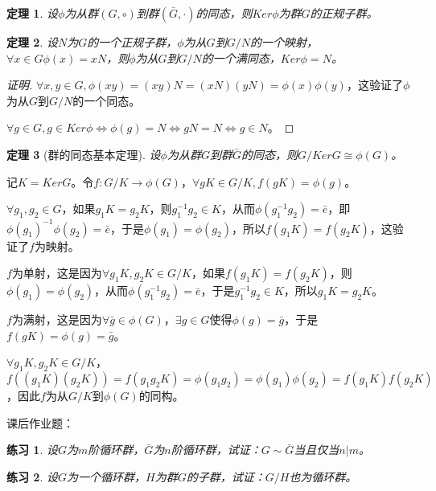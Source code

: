 \documentclass{article}
\newtheorem{Thm}{定理}
\newtheorem{Exercise}{练习}
\begin{document}
\begin{CJK*}{UTF8}{gbsn}
\begin{Thm}
  设$\phi$为从群$(G,\circ)$到群$(\bar{G},\cdot)$的同态，则$Ker \phi$为群$G$的正规子群。
\end{Thm}

\begin{Thm}
设$N$为$G$的一个正规子群，$\phi$为从$G$到$G/N$的一个映射，$\forall x\in G \phi(x)=xN$，则$\phi$为从$G$到$G/N$的一个满同态，$Ker \phi=N$。
\end{Thm}
\begin{proof}[证明]
  $\forall x,y\in G, \phi(xy)=(xy)N=(xN)(yN)=\phi(x)\phi(y)$，这验证了$\phi$为从$G$到$G/N$的一个同态。

  $\forall g\in G, g\in Ker\phi \Leftrightarrow \phi(g)=N \Leftrightarrow gN=N \Leftrightarrow g\in N$。
\end{proof}
\begin{Thm}[群的同态基本定理]
设$\phi$为从群$G$到群$\bar{G}$的同态，则$G/Ker G \cong \phi(G)$。
\end{Thm}
记$K=KerG$。令$f:G/K\to \phi(G)$，$\forall gK\in G/K, f(gK)=\phi(g)$。

$\forall g_1,g_2\in G$，如果$g_1K=g_2K$，则$g_1^{-1}g_2\in K$，从而$\phi(g_1^{-1}g_2)=\bar{e}$，即$\phi(g_1)^{-1}\phi(g_2)=\bar{e}$，于是$\phi(g_1)=\phi(g_2)$，所以$f(g_1K)=f(g_2K)$，这验证了$f$为映射。

$f$为单射，这是因为$\forall g_1K,g_2K\in G/K$，如果$f(g_1K)=f(g_2K)$，则$\phi(g_1)=\phi(g_2)$，从而$\phi(g_1^{-1}g_2)=\bar{e}$，于是$g_1^{-1}g_2\in K$，所以$g_1K=g_2K$。

$f$为满射，这是因为$\forall \bar{g}\in \phi(G)$，$\exists g\in G$使得$\phi(g)=\bar{g}$，于是$f(gK)=\phi(g)=\bar{g}$。

$\forall g_1K,g_2K\in G/K$，$f((g_1K)(g_2K))=f(g_1g_2K)=\phi(g_1g_2)=\phi(g_1)\phi(g_2)=f(g_1K)f(g_2K)$，因此$f$为从$G/K$到$\phi(G)$的同构。

课后作业题：
\begin{Exercise}
设$G$为$m$阶循环群，$\bar{G}$为$n$阶循环群，试证：$G \sim \bar{G}$当且仅当$n | m$。
\end{Exercise}

\begin{Exercise}
设$G$为一个循环群，$H$为群$G$的子群，试证：$G/H$也为循环群。
\end{Exercise}
\end{CJK*}
\end{document}

